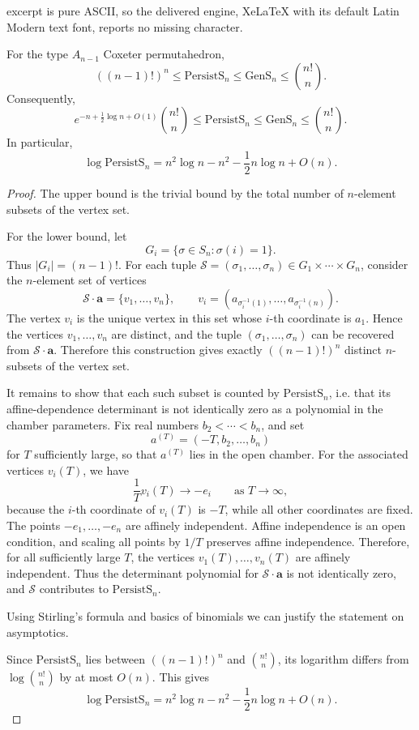 \documentclass[10pt,a4paper]{amsart}
\def\ba{\mathbf{a}}
\def\cS{\mathcal{S}}
\def\gsimp{\mathrm{GenS}}
\def\psimp{\mathrm{PersistS}}
\begin{document}
excerpt is pure ASCII, so the delivered engine, XeLaTeX with its default Latin Modern text font, reports no missing character.
\begin{lem}\label{lem:asymptotics}
For the type \(A_{n-1}\) Coxeter permutahedron,
\[
((n-1)!)^n \le \psimp_n \le \gsimp_n \le \binom{n!}{n}.
\]
Consequently,
\[
e^{-n+\frac12\log n+O(1)}\binom{n!}{n}
\le \psimp_n
\le
\gsimp_n \le
\binom{n!}{n}.
\]
In particular,
\[
\log \psimp_n
=
 n^2\log n-n^2-\frac12 n\log n+O(n).
\]
\end{lem}

\begin{proof}
The upper bound is the trivial bound by the total number of \(n\)-element
subsets of the vertex set.

For the lower bound, let
\[
G_i=\{\sigma\in S_n:\sigma(i)=1\}.
\]
Thus \(|G_i|=(n-1)!\). For each tuple
\(\cS=(\sigma_1,\dots,\sigma_n)\in G_1\times\cdots\times G_n\), consider the
\(n\)-element set of vertices
\[
\cS\cdot\ba
=
\{v_1,\dots,v_n\},
\qquad
v_i=(a_{\sigma_i^{-1}(1)},\dots,a_{\sigma_i^{-1}(n)}).
\]
The vertex \(v_i\) is the unique vertex in this set whose \(i\)-th coordinate
is \(a_1\). Hence the vertices \(v_1,\dots,v_n\) are distinct, and the tuple
\((\sigma_1,\dots,\sigma_n)\) can be recovered from \(\cS\cdot\ba\). Therefore
this construction gives exactly \(((n-1)!)^n\) distinct \(n\)-subsets of the
vertex set.

It remains to show that each such subset is counted by \(\psimp_n\), i.e.
that its affine-dependence determinant is not identically zero as a polynomial
in the chamber parameters. Fix real numbers
\(b_2<\cdots<b_n\), and set
\[
a^{(T)}=(-T,b_2,\dots,b_n)
\]
for \(T\) sufficiently large, so that \(a^{(T)}\) lies in the open chamber.
For the associated vertices \(v_i(T)\), we have
\[
\frac{1}{T}v_i(T)\longrightarrow -e_i
\qquad\text{as }T\to\infty,
\]
because the \(i\)-th coordinate of \(v_i(T)\) is \(-T\), while all other
coordinates are fixed. The points
\(-e_1,\dots,-e_n\) are affinely independent. Affine independence is an open
condition, and scaling all points by \(1/T\) preserves affine independence.
Therefore, for all sufficiently large \(T\), the vertices
\(v_1(T),\dots,v_n(T)\) are affinely independent. Thus the determinant
polynomial for \(\cS\cdot\ba\) is not identically zero, and
\(\cS\) contributes to \(\psimp_n\). 

Using Stirling's formula and basics of binomials we can justify the statement on asymptotics.

Since \(\psimp_n\) lies between \(((n-1)!)^n\) and \(\binom{n!}{n}\), its
logarithm differs from \(\log\binom{n!}{n}\) by at most \(O(n)\). This gives
\[
\log \psimp_n
=
 n^2\log n-n^2-\frac12n\log n+O(n).
\]
\end{proof}
\end{document}
